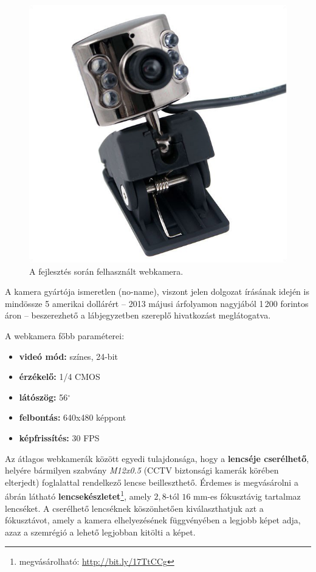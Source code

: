 \begin{figure}[!ht]
\centering
\includegraphics[width=120mm, keepaspectratio]{figures/webcam.png}
\caption{A fejlesztés során felhasznált webkamera.}
\label{fig:webcam}
\end{figure}

A kamera gyártója ismeretlen (no-name), viszont jelen dolgozat írásának idején is mindössze 5 amerikai dollárért  -- 2013 májusi árfolyamon nagyjából 1\,200 forintos áron -- beszerezhető a lábjegyzetben szereplő hivatkozást meglátogatva.

A webkamera főbb paraméterei:

\begin{itemize}
  \item \textbf{videó mód:} színes, 24-bit 
  \item \textbf{érzékelő:} 1/4 CMOS
  \item \textbf{látószög:} 56$^{\circ}$
  \item \textbf{felbontás:} 640x480 képpont
  \item \textbf{képfrissítés:} 30 FPS
\end{itemize}

Az átlagos webkamerák között egyedi tulajdonsága, hogy a \textbf{lencséje cserélhető}, helyére bármilyen szabvány \emph{M12x0.5} (CCTV biztonsági kamerák körében elterjedt) foglalattal rendelkező lencse beilleszthető. Érdemes is megvásárolni a  ábrán látható \textbf{lencsekészletet}\footnote{megvásárolható: \url{http://bit.ly/17TtCCg}}, amely $2,\!8$-tól $16$ mm-es fókusztávig tartalmaz lencséket. A cserélhető lencséknek köszönhetően kiválaszthatjuk azt a fókusztávot, amely a kamera elhelyezésének függvényében a legjobb képet adja, azaz a szemrégió a lehető legjobban kitölti a képet.

